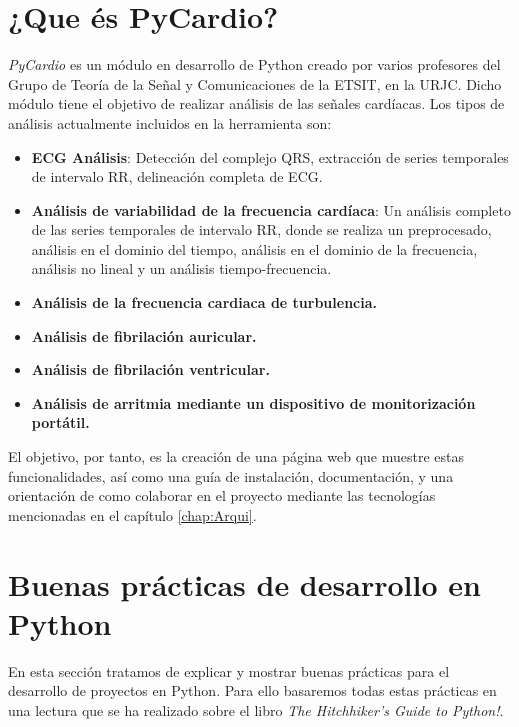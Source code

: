 \section{¿Que és PyCardio?}
\label{sec:explainPyCardio}
\emph{PyCardio} es un módulo en desarrollo  de Python creado por varios profesores del Grupo de Teoría de la Señal y Comunicaciones de la ETSIT, en la URJC. Dicho módulo tiene el objetivo de realizar análisis de las señales cardíacas. Los tipos de análisis actualmente incluidos en la herramienta son:
\begin{itemize}
    \item \textbf{ECG Análisis}: Detección del complejo QRS, extracción de series temporales de intervalo RR, delineación completa de ECG.
    \item \textbf{Análisis de variabilidad de la frecuencia cardíaca}: Un análisis completo de las series temporales de intervalo RR, donde se realiza un preprocesado, análisis en  el dominio del tiempo, análisis en el dominio de la frecuencia, análisis no lineal y un análisis tiempo-frecuencia.
    \item \textbf{Análisis de la frecuencia cardiaca de turbulencia.}
    \item \textbf{Análisis de fibrilación auricular.}
    \item \textbf{Análisis de fibrilación ventricular.}
    \item \textbf{Análisis de arritmia mediante un dispositivo de monitorización portátil.}
\end{itemize}

El objetivo, por tanto, es la creación de una página web que muestre estas funcionalidades, así como una guía de instalación, documentación, y una orientación de como colaborar en el proyecto mediante las tecnologías mencionadas en el capítulo \ref{chap:Arqui}.

\section{Buenas prácticas de desarrollo en Python}
\label{subsec:bestPracticses}
En esta sección tratamos de explicar y mostrar buenas prácticas para el desarrollo de proyectos en Python. Para ello basaremos todas estas prácticas en una lectura que se ha realizado sobre el libro \emph{The Hitchhiker’s Guide to Python!}\cite{pythonGuide}.\\

